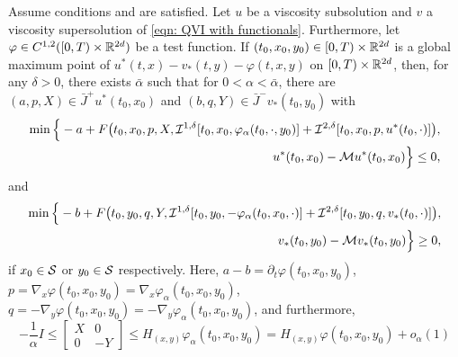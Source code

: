 \begin{corollary}
\label{cor: Corollary 5.13 in Seydel}
    Assume conditions  and  are satisfied. Let $u$ be a viscosity subsolution and $v$ a viscosity supersolution of \eqref{eqn: QVI with functionals}. Furthermore, let $\varphi \in C^{1,2}([0,T) \times \mathbb{R}^{2d})$ be a test function. If $(t_0,x_0,y_0) \in [0,T) \times \mathbb{R}^{2d}$ is a global maximum point of $u^*(t,x) - v_*(t,y) - \varphi(t,x,y)$ on $[0,T) \times \mathbb{R}^{2d}$, then, for any $\delta > 0$, there exists $\bar \alpha$ such that for $0< \alpha < \bar \alpha$, there are $(a,p,X) \in \bar J^+ u^*(t_0,x_0)$ and $(b,q,Y) \in \bar J^- v_*(t_0,y_0)$ with 
    \begin{align*}
        \min \Big\{ -a + F\big(t_0, x_0, p, X, \mathcal{I}^{1, \delta} [t_0,x_0,\varphi_\alpha (t_0, \cdot, y_0)] + \mathcal{I}^{2, \delta} [t_0,x_0,p,u^*(t_0,\cdot)] \big), \\
        u^*(t_0,x_0) - \mathcal{M} u^* (t_0,x_0) \Big\} \leq 0,
    \end{align*}
    and 
    \begin{align*}
        \min \Big\{ -b + F\big(t_0, y_0, q, Y, \mathcal{I}^{1, \delta} [t_0,y_0,-\varphi_\alpha (t_0, x_0, \cdot)] + \mathcal{I}^{2, \delta} [t_0,y_0,q,v_*(t_0,\cdot)] \big), \\
        v_*(t_0,y_0) - \mathcal{M} v_* (t_0,y_0) \Big\} \geq 0,
    \end{align*}
    if $x_0 \in \mathcal{S}$ or $y_0 \in \mathcal{S}$ respectively. Here, $a-b = \partial_t \varphi (t_0,x_0,y_0)$, $p = \nabla_x \varphi (t_0,x_0,y_0) = \nabla_x \varphi_\alpha (t_0,x_0,y_0)$, $q=-\nabla_y \varphi(t_0,x_0,y_0) = - \nabla_y \varphi_\alpha (t_0,x_0,y_0)$, and furthermore, 
    \begin{equation}
        -\frac{1}{\alpha} I \leq 
            \begin{bmatrix}
            X & 0 \\
            0 & -Y 
            \end{bmatrix}
        \leq H_{(x,y)} \varphi_\alpha (t_0,x_0,y_0) = H_{(x,y)} \varphi(t_0,x_0,y_0) + o_\alpha(1) 
        \label{eqn: (48) in Seydel}
    \end{equation}
\end{corollary}

